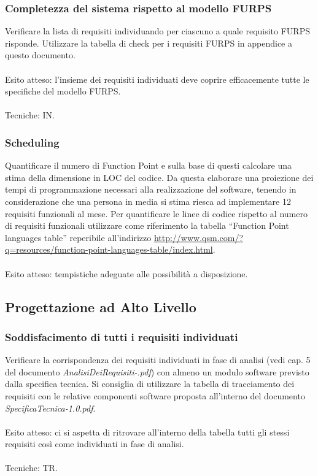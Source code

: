 \subsubsection*{Completezza del sistema rispetto al modello FURPS}

Verificare la lista di requisiti individuando per ciascuno a quale requisito
FURPS risponde. Utilizzare la tabella di check per i requisiti FURPS in
appendice a questo documento.
\\\\
Esito atteso: l'insieme dei requisiti individuati deve coprire
efficacemente tutte le specifiche del modello FURPS.
\\\\ Tecniche: IN.

\subsubsection*{Scheduling}

Quantificare il numero di Function Point e sulla base di questi calcolare una
stima della dimensione in LOC del codice. Da questa elaborare una proiezione dei
tempi di programmazione necessari alla realizzazione del software, tenendo in
considerazione che una persona in media si stima riesca ad implementare 12
requisiti funzionali al mese. Per quantificare le linee di codice
rispetto al numero di requisiti funzionali utilizzare come riferimento la
tabella ``Function Point languages table'' reperibile all'indirizzo
\url{http://www.qsm.com/?q=resources/function-point-languages-table/index.html}.
\\\\
Esito atteso: tempistiche adeguate alle possibilit\`a a disposizione.


\subsection{Progettazione ad Alto Livello}

\subsubsection*{Soddisfacimento di tutti i requisiti individuati}

Verificare la corrispondenza dei requisiti individuati in fase di analisi (vedi
cap. 5 del documento \emph{AnalisiDeiRequisiti-\versioneAR.pdf}) con almeno un modulo
software previsto dalla specifica tecnica. Si consiglia di utilizzare la tabella di tracciamento dei requisiti con le relative componenti
software proposta all'interno del documento \emph{SpecificaTecnica-1.0.pdf}.
\\\\
Esito atteso: ci si aspetta di ritrovare all'interno della tabella tutti gli
stessi requisiti cos\`i come individuati in fase di analisi.
\\\\
Tecniche: TR.
